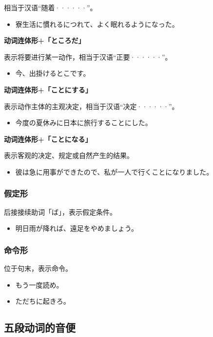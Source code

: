 相当于汉语``随着······''。
\begin{itemize}
  \item 寮生活に慣れるにつれて、よく眠れるようになった。
\end{itemize}

{\bf
\noindent 动词连体形+「ところだ」
}

表示将要进行某一动作，相当于汉语``正要······''。
\begin{itemize}
  \item 今、出掛けるとこです。
\end{itemize}

{\bf
\noindent 动词连体形+「ことにする」
}

表示动作主体的主观决定，相当于汉语``决定······''。
\begin{itemize}
  \item 今度の夏休みに日本に旅行することにした。
\end{itemize}

{\bf
\noindent 动词连体形+「ことになる」
}

表示客观的决定、规定或自然产生的结果。
\begin{itemize}
  \item 彼は急に用事ができたので、私が一人で行くことになりました。
\end{itemize}


\subsubsection{假定形}%

后接接续助词「ば」，表示假定条件。
\begin{itemize}
  \item 明日雨が降れば、遠足をやめましょう。
\end{itemize}


\subsubsection{命令形}%

位于句末，表示命令。
\begin{itemize}
  \item もう一度読め。
  \item ただちに起きろ。
\end{itemize}



\subsection{五段动词的音便}%

